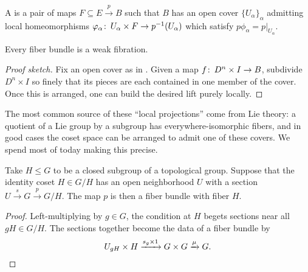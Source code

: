 \begin{definition}\label{FiberBundleDefn}%
A  is a pair of maps $F \subseteq E \xrightarrow p B$ such that $B$ has an open cover $\{U_\alpha\}_\alpha$ admitting local homeomorphisms $\varphi_\alpha\colon\thinspace U_\alpha \times F \to p^{-1}(U_\alpha)$ which satisfy $p \phi_\alpha = p|_{U_\alpha}$.
\end{definition}

\begin{lemma}
Every fiber bundle is a weak fibration.
\end{lemma}
\begin{proof}[Proof sketch]
Fix an open cover as in .  Given a map $f\colon\thinspace D^n \times I \to B$, subdivide $D^n \times I$ so finely that its pieces are each contained in one member of the cover.  Once this is arranged, one can build the desired lift purely locally.
\end{proof}

The most common source of these ``local projections'' come from Lie theory: a quotient of a Lie group by a subgroup has everywhere-isomorphic fibers, and in good cases the coset space can be arranged to admit one of these covers.
We spend most of today making this precise.

\begin{lemma}
Take $H \le G$ to be a closed subgroup of a topological group.
Suppose that the identity coset $H \in G/H$ has an open neighborhood $U$ with a section $U \xrightarrow s G \xrightarrow p G/H$.
The map $p$ is then a fiber bundle with fiber $H$.
\end{lemma}
\begin{proof}
Left-multiplying by $g \in G$, the condition at $H$ begets sections near all $gH \in G/H$.
The sections together become the data of a fiber bundle by \[U_{gH} \times H \xrightarrow{s_g \times 1} G \times G \xrightarrow\mu G. \qedhere\]
\end{proof}

